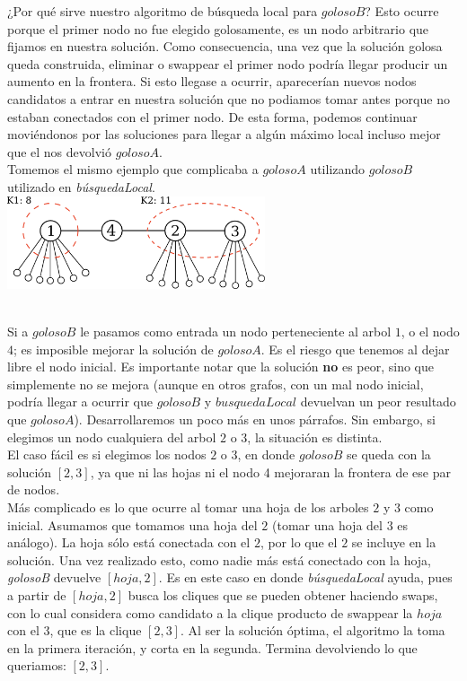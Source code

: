¿Por qué sirve nuestro algoritmo de búsqueda local para $golosoB$? Esto ocurre porque el primer nodo no fue elegido golosamente, es un nodo arbitrario que fijamos en nuestra solución. Como consecuencia, una vez que la solución golosa queda construida, eliminar o swappear el primer nodo podría llegar producir un aumento en la frontera. Si esto llegase a ocurrir, aparecerían nuevos nodos candidatos a entrar en nuestra solución que no podiamos tomar antes porque no estaban conectados con el primer nodo. De esta forma, podemos continuar moviéndonos por las soluciones para llegar a algún máximo local incluso mejor que el nos devolvió $golosoA$. \\

Tomemos el mismo ejemplo que complicaba a $golosoA$ utilizando $golosoB$ utilizado en \textit{búsquedaLocal}. \\

{\centering
    \includegraphics[width=0.57\textwidth]{informe/imgs/greedy_base_nodes_v2.png} \\
}
$ $\newline

Si a $golosoB$ le pasamos como entrada un nodo perteneciente al arbol $1$, o el nodo $4$; es imposible mejorar la solución de $golosoA$. Es el riesgo que tenemos al dejar libre el nodo inicial. Es importante notar que la solución \textbf{no} es peor, sino que simplemente no se mejora (aunque en otros grafos, con un mal nodo inicial, podría llegar a ocurrir que $golosoB$ y $busquedaLocal$ devuelvan un peor resultado que $golosoA$). Desarrollaremos un poco más en unos párrafos. Sin embargo, si elegimos un nodo cualquiera del arbol $2$ o $3$, la situación es distinta. \\

El caso fácil es si elegimos los nodos $2$ o $3$, en donde $golosoB$ se queda con la solución $[2,3]$, ya que ni las hojas ni el nodo 4 mejoraran la frontera de ese par de nodos. \\

Más complicado es lo que ocurre al tomar una hoja de los arboles $2$ y $3$ como inicial. Asumamos que tomamos una hoja del $2$ (tomar una hoja del $3$ es análogo). La hoja sólo está conectada con el $2$, por lo que el $2$ se incluye en la solución. Una vez realizado esto, como nadie más está conectado con la hoja, \textit{golosoB} devuelve $[hoja,2]$. Es en este caso en donde \textit{búsquedaLocal} ayuda, pues a partir de $[hoja,2]$ busca los cliques que se pueden obtener haciendo swaps, con lo cual considera como candidato a la clique producto de swappear la $hoja$ con el $3$, que es la clique $[2,3]$. Al ser la solución óptima, el algoritmo la toma en la primera iteración, y corta en la segunda. Termina devolviendo lo que queriamos: $[2,3]$. \\

